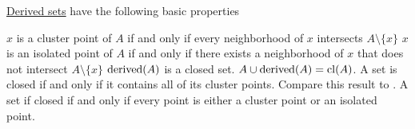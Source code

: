 \begin{proposition}\label{thm:derived_set_properties}
  \hyperref[def:topological_derived_set]{Derived sets} have the following basic properties
  \begin{thmenum}
     \( x \) is a cluster point of \( A \) if and only if every neighborhood of \( x \) intersects \( A \setminus \{ x \} \)
     \( x \) is an isolated point of \( A \) if and only if there exists a neighborhood of \( x \) that does not intersect \( A \setminus \{ x \} \)
     \( \operatorname{derived}(A) \) is a closed set.
     \( A \cup \operatorname{derived}(A) = \operatorname{cl}(A) \).
     A set is closed if and only if it contains all of its cluster points. Compare this result to .
     A set if closed if and only if every point is either a cluster point or an isolated point.
  \end{thmenum}
\end{proposition}
